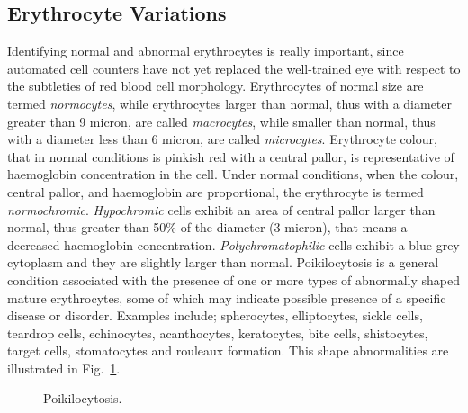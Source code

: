 \documentclass[final,a4paper,12pt,english]{UnicaPhdThesis3}
\begin{document}
\subsection{Erythrocyte Variations}
Identifying normal and abnormal erythrocytes is really important, since automated cell counters have not yet replaced the well-trained eye with respect to the subtleties of red blood cell morphology. Erythrocytes of normal size are termed \textit{normocytes}, while erythrocytes larger than normal, thus with a diameter greater than 9 micron, are called \textit{macrocytes}, while smaller than normal, thus with a diameter less than 6 micron, are called \textit{microcytes}. Erythrocyte colour, that in normal conditions is pinkish red with a central pallor, is representative of haemoglobin concentration in the cell. Under normal conditions, when the colour, central pallor, and haemoglobin are proportional, the erythrocyte is termed \textit{normochromic}. \textit{Hypochromic} cells exhibit an area of central pallor larger than normal, thus greater than 50\% of the diameter (3 micron), that means a decreased haemoglobin concentration. \textit{Polychromatophilic} cells exhibit a blue-grey cytoplasm and they are slightly larger than normal. Poikilocytosis is a general condition associated with the presence of one or more types of abnormally shaped mature erythrocytes, some of which may indicate possible presence of a specific disease or disorder. Examples include; spherocytes, elliptocytes, sickle cells, teardrop cells, echinocytes, acanthocytes, keratocytes, bite cells, shistocytes, target cells, stomatocytes and rouleaux formation. This shape abnormalities are illustrated in Fig.~\ref{fig:Poikilocytosis}.

\begin{figure}[!htbp]
\centering
\caption{\label{fig:Poikilocytosis} Poikilocytosis.}
\end{figure}
\end{document}
